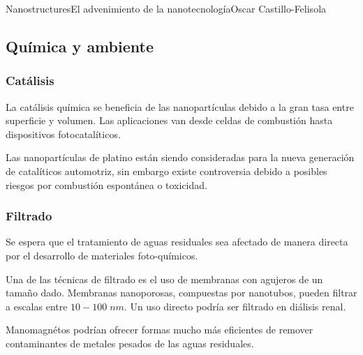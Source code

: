 \begin{article}{Nanostructures}{El advenimiento de la nanotecnolog\'ia}{Oscar Castillo-Felisola}
\subsection{Qu\'imica y ambiente}

\subsubsection*{Cat\'alisis}

La cat\'alisis qu\'imica se beneficia de las nanopart\'iculas debido a la gran tasa entre superficie y volumen. Las aplicaciones van desde celdas de combusti\'on hasta dispositivos fotocatal\'iticos.

Las nanopart\'iculas de platino est\'an siendo consideradas para la nueva generaci\'on de catal\'iticos automotriz, sin embargo existe controversia debido a posibles riesgos por combusti\'on espont\'anea o toxicidad.

\subsubsection*{Filtrado}

Se espera que el tratamiento de aguas residuales sea afectado de manera directa por el desarrollo de materiales foto-qu\'imicos.


Una de las t\'ecnicas de filtrado es el uso de membranas con agujeros de un tama\~no dado. Membranas nanoporosas, compuestas por nanotubos, pueden filtrar a escalas entre $10-100\;nm$. Un uso directo podr\'ia ser filtrado en di\'alisis renal.

Manomagn\'etos podr\'ian ofrecer formas mucho m\'as eficientes de remover contaminantes de metales pesados de las aguas residuales.







\end{article}
